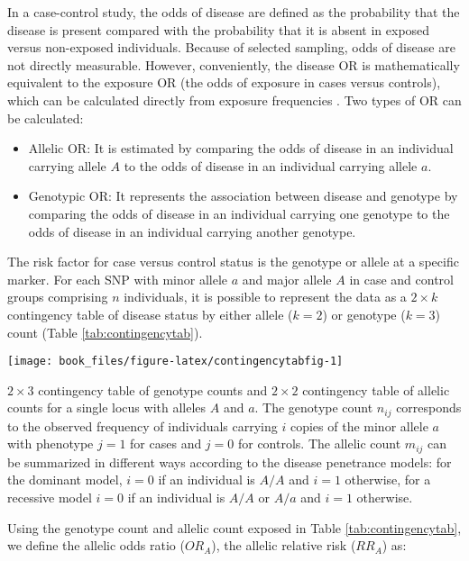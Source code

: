 \documentclass[]{book}
\begin{document}
In a case-control study, the odds of disease are defined as the
probability that the disease is present compared with the probability
that it is absent in exposed versus non-exposed individuals. Because of
selected sampling, odds of disease are not directly measurable. However,
conveniently, the disease OR is mathematically equivalent to the
exposure OR (the odds of exposure in cases versus controls), which can
be calculated directly from exposure frequencies \citep{balding2008handbook}.
Two types of OR can be calculated:

\begin{itemize}
\item
  Allelic OR: It is estimated by comparing the odds of disease in an
  individual carrying allele \(A\) to the odds of disease in an
  individual carrying allele \(a\).
\item
  Genotypic OR: It represents the association between disease and
  genotype by comparing the odds of disease in an individual carrying
  one genotype to the odds of disease in an individual carrying
  another genotype.
\end{itemize}

The risk factor for case versus control status is the genotype or allele
at a specific marker. For each SNP with minor allele \(a\) and major
allele \(A\) in case and control groups comprising \(n\) individuals, it is
possible to represent the data as a \(2 \times k\) contingency table of
disease status by either allele (\(k = 2\)) or genotype (\(k = 3\)) count
(Table \ref{tab:contingencytab}).

\begin{center}\texttt{[image: book\_files/figure-latex/contingencytabfig-1]} \end{center}

\label{tab:contingencytab}\(2 \times 3\) contingency table of genotype counts and \(2 \times 2\) contingency table of allelic counts for a single locus with alleles \(A\) and \(a\). The genotype count \(n_{ij}\) corresponds to the observed frequency of individuals carrying \(i\) copies of the minor allele \(a\) with phenotype \(j=1\) for cases and \(j=0\) for controls. The allelic count \(m_{ij}\) can be summarized in different ways according to the disease penetrance models: for the dominant model, \(i=0\) if an individual is \(A/A\) and \(i=1\) otherwise, for a recessive model \(i=0\) if an individual is \(A/A\) or \(A/a\) and \(i=1\) otherwise.

Using the genotype count and allelic count exposed in Table
\ref{tab:contingencytab}, we define the allelic odds ratio (\(OR_A\)), the
allelic relative risk (\(RR_A\)) as:
\end{document}
